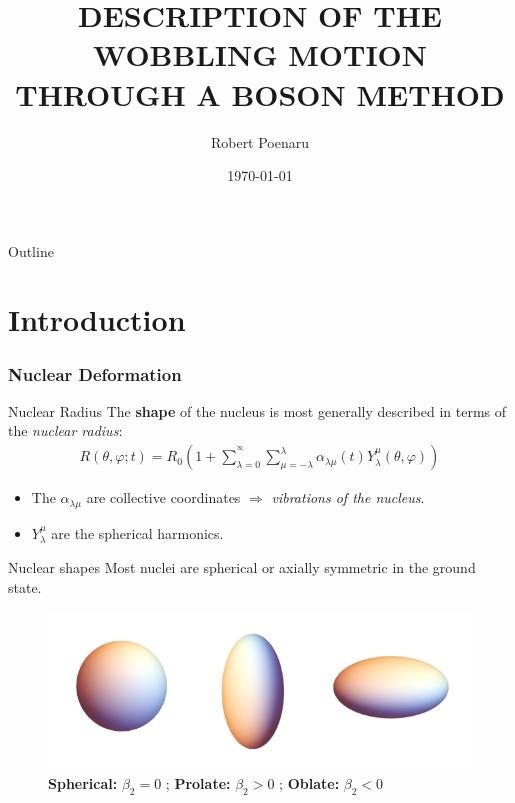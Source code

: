\documentclass{beamer}
\title[presentation]{DESCRIPTION OF THE WOBBLING MOTION THROUGH A BOSON METHOD}
\author{Robert Poenaru}
\institute{DFT, IFIN-HH\\Doctoral School of Physics, UB}
\date{\today}
\begin{document}
\begin{frame}
  \titlepage
\end{frame}

\begin{frame}{Outline}
 \tableofcontents
\end{frame}

\section{Introduction}

\begin{frame}
  \frametitle{Nuclear Deformation}

  \begin{exampleblock}{Nuclear Radius}
    The \textbf{shape} of the nucleus is most generally described in terms of the \emph{nuclear radius}:
    \begin{align}
      R(\theta,\varphi;t)=R_0\left(1+\sum_{\lambda=0}^{^\infty}\sum_{\mu=-\lambda}^\lambda\alpha_{\lambda\mu}(t)Y_\lambda^\mu(\theta,\varphi)\right)
    \end{align}
  \end{exampleblock}
\begin{itemize}
  \item The $\alpha_{\lambda\mu}$ are collective coordinates $\Longrightarrow$ \emph{vibrations of the nucleus}.
  \item $Y_\lambda^\mu$ are the spherical harmonics.
\end{itemize}
\end{frame}


\begin{frame}{Nuclear shapes}
  Most nuclei are spherical or axially symmetric in the ground state.
    \begin{figure}
      \centering
      \includegraphics[scale=0.4]{figures/nuclear_shapes.png}
      \caption{\textbf{Spherical:} $\beta_2=0$ ; \textbf{Prolate:} $\beta_2>0$ ; \textbf{Oblate:} $\beta_2<0$}
    \end{figure}
  \end{frame}
\end{document}
